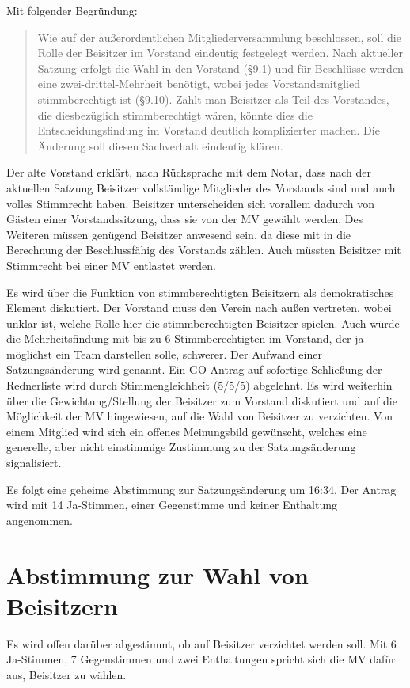 \documentclass[DIV=calc,parksip=half*]{scrartcl}
\begin{document}
Mit folgender Begründung: 
\begin{quote}
Wie auf der außerordentlichen Mitgliederversammlung beschlossen, soll die Rolle der Beisitzer im Vorstand eindeutig festgelegt werden. Nach aktueller Satzung erfolgt die Wahl in den Vorstand (§9.1) und für Beschlüsse werden  eine zwei-drittel-Mehrheit benötigt, wobei jedes Vorstandsmitglied stimmberechtigt ist (§9.10). Zählt man Beisitzer als Teil des Vorstandes, die diesbezüglich stimmberechtigt wären, könnte dies die Entscheidungsfindung im Vorstand deutlich komplizierter machen. Die Änderung soll diesen Sachverhalt eindeutig klären.
\end{quote}

Der alte Vorstand erklärt, nach Rücksprache mit dem Notar, dass nach der aktuellen Satzung Beisitzer vollständige Mitglieder des Vorstands sind und auch volles Stimmrecht haben. Beisitzer unterscheiden sich vorallem dadurch von Gästen einer Vorstandssitzung, dass sie von der MV gewählt werden. Des Weiteren müssen genügend Beisitzer anwesend sein, da diese mit in die Berechnung der Beschlussfähig des Vorstands zählen. Auch müssten Beisitzer mit Stimmrecht bei einer MV entlastet werden.

Es wird über die Funktion von stimmberechtigten Beisitzern als demokratisches Element diskutiert. Der Vorstand muss den Verein nach außen vertreten, wobei unklar ist, welche Rolle hier die stimmberechtigten Beisitzer spielen. Auch würde die Mehrheitsfindung mit bis zu 6 Stimmberechtigten im Vorstand, der ja möglichst ein Team darstellen solle, schwerer. Der Aufwand einer Satzungsänderung wird genannt. 
Ein GO Antrag auf sofortige Schließung der Rednerliste wird durch Stimmengleichheit (5/5/5) abgelehnt.
Es wird weiterhin über die Gewichtung/Stellung der Beisitzer zum Vorstand diskutiert und auf die Möglichkeit der MV hingewiesen, auf die Wahl von Beisitzer zu verzichten. Von einem Mitglied wird sich ein offenes Meinungsbild gewünscht, welches eine generelle, aber nicht einstimmige Zustimmung zu der Satzungsänderung signalisiert.

Es folgt eine geheime Abstimmung zur Satzungsänderung um 16:34. Der Antrag wird mit 14 Ja-Stimmen, einer Gegenstimme und keiner Enthaltung angenommen.
\section{Abstimmung zur Wahl von Beisitzern}

Es wird offen darüber abgestimmt, ob auf Beisitzer verzichtet werden soll. Mit 6 Ja-Stimmen, 7 Gegenstimmen und zwei Enthaltungen spricht sich die MV dafür aus, Beisitzer zu wählen.
\end{document}
